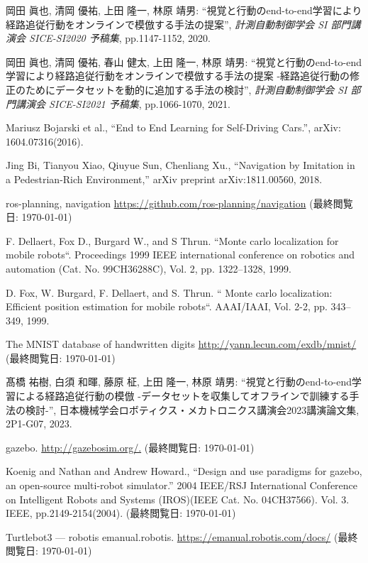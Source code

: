 
\begin{thebibliography}{99}

  岡田 眞也, 清岡 優祐, 上田 隆一, 林原 靖男: ``視覚と行動のend-to-end学習により経路追従行動をオンラインで模倣する手法の提案'', \textit{計測自動制御学会 SI 部門講演会 SICE-SI2020 予稿集}, pp.1147-1152, 2020.

  岡田 眞也, 清岡 優祐, 春山 健太, 上田 隆一, 林原 靖男: ``視覚と行動のend-to-end学習により経路追従行動をオンラインで模倣する手法の提案 -経路追従行動の修正のためにデータセットを動的に追加する手法の検討'', \textit{計測自動制御学会 SI 部門講演会 SICE-SI2021 予稿集}, pp.1066-1070, 2021.

  Mariusz Bojarski et al., ``End to End Learning for Self-Driving Cars.'', arXiv: 1604.07316(2016). 

  Jing Bi, Tianyou Xiao, Qiuyue Sun, Chenliang Xu., ``Navigation by Imitation in a Pedestrian-Rich Environment,'' arXiv preprint arXiv:1811.00560, 2018.

  ros-planning, navigation
  \url{https://github.com/ros-planning/navigation}
  (最終閲覧日: \today)

  F. Dellaert, Fox D., Burgard W., and S Thrun. “Monte carlo localization for mobile robots“. Proceedings 1999 IEEE international conference on robotics and automation (Cat. No. 99CH36288C), Vol. 2, pp. 1322–1328, 1999.

  D. Fox, W. Burgard, F. Dellaert, and S. Thrun. “ Monte carlo localization: Efficient position estimation for mobile robots“. AAAI/IAAI, Vol. 2-2, pp. 343–349, 1999.

  The MNIST database of handwritten digits
  \url{http://yann.lecun.com/exdb/mnist/}
  (最終閲覧日: \today)

  髙橋 祐樹, 白須 和暉, 藤原 柾, 上田 隆一, 林原 靖男: ``視覚と行動のend-to-end学習による経路追従行動の模倣 -データセットを収集してオフラインで訓練する手法の検討-'', 日本機械学会ロボティクス・メカトロニクス講演会2023講演論文集, 2P1-G07, 2023.

  gazebo.
  \url{http://gazebosim.org/.}
  (最終閲覧日: \today)

  Koenig and Nathan and Andrew Howard., ``Design and use paradigms for gazebo, an open-source multi-robot simulator.'' 2004 IEEE/RSJ International Conference on Intelligent Robots and Systems (IROS)(IEEE Cat. No. 04CH37566). Vol. 3. IEEE, pp.2149-2154(2004).
  (最終閲覧日: \today)

  Turtlebot3 — robotis emanual.robotis.
  \url{https://emanual.robotis.com/docs/}
  (最終閲覧日: \today)

\end{thebibliography}